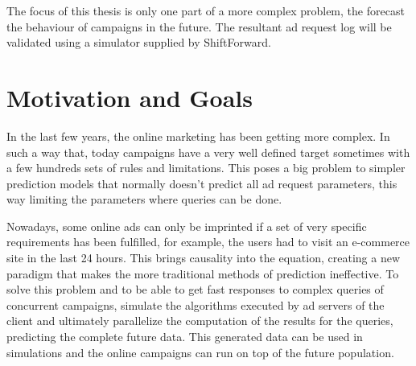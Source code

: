The focus of this thesis is only one part of a more complex problem, the
forecast the behaviour of campaigns in the future. The resultant ad request log
will be validated using a simulator supplied by ShiftForward.




\section{Motivation and Goals} \label{sec:goals}

In the last few years, the online marketing has been getting more complex. In
such a way that, today campaigns have a very well defined target sometimes with
a few hundreds sets of rules and limitations. This poses a big problem to
simpler prediction models that normally doesn't predict all ad request
parameters, this way limiting the parameters where queries can be done.


Nowadays, some online ads can only be imprinted if a set of very specific requirements has been fulfilled, for example,
the users had to visit an e-commerce site in the last 24 hours. This brings causality into the equation, creating a new paradigm that makes 
the more traditional methods of prediction ineffective. To solve this problem
and to be able to get fast responses to complex queries of concurrent campaigns,
simulate the algorithms executed by ad servers of the client
and ultimately parallelize the computation of the results for the
queries,
predicting the complete future data. This generated data
can be used in simulations and the online campaigns can run on top of the future population.

